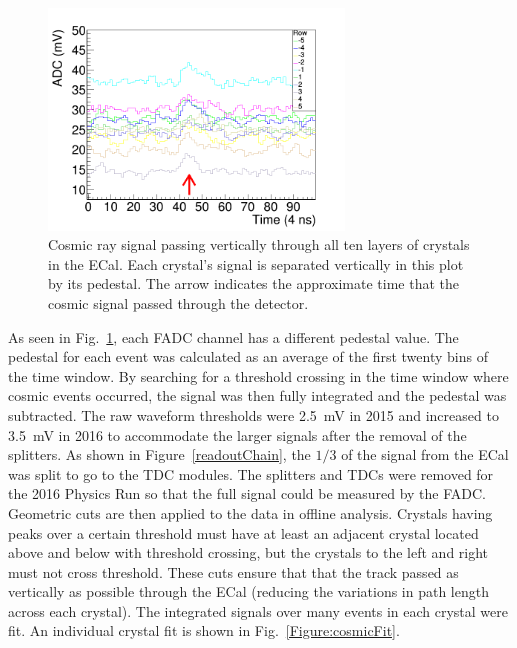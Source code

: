 \begin{figure}[htb]
  \centering
      \includegraphics[width=0.7\textwidth]{pics/performance/cosmicSignal.png}
  \caption[Real cosmic ray signal in raw FADC waveform passing vertically through ECal]{Cosmic ray signal passing vertically through all ten layers of crystals in the ECal. Each crystal's signal is separated vertically in this plot by its pedestal. The arrow indicates the approximate time that the cosmic signal passed through the detector.}
  \label{Figure:cosmicSig}
\end{figure}

As seen in Fig.~\ref{Figure:cosmicSig}, each FADC channel has a different pedestal value. The pedestal for each event was calculated as an average of the first twenty bins of the time window. By searching for a threshold crossing in the time window where cosmic events occurred, the signal was then fully integrated and the pedestal was subtracted. The raw waveform thresholds were 2.5~mV in 2015 and increased to 3.5~mV in 2016 to accommodate the larger signals after the removal of the splitters. As shown in Figure~\ref{readoutChain}, the $1/3$ of the signal from the ECal was split to go to the TDC modules. The splitters and TDCs were removed for the 2016 Physics Run so that the full signal could be measured by the FADC. Geometric cuts are then applied to the data in offline analysis. Crystals having peaks over a certain threshold must have at least an adjacent crystal located above and below with threshold crossing, but the crystals to the left and right must not cross threshold. These cuts ensure that that the track passed as vertically as possible through the ECal (reducing the variations in path length across each crystal). The integrated signals over many events in each crystal were fit. An individual crystal fit is shown in Fig.~\ref{Figure:cosmicFit}.

